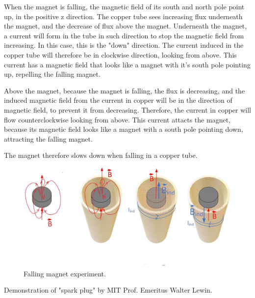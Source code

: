 \documentclass{ximera}
\begin{document}
When the magnet is falling, the magnetic field of its south and north pole point up, in the positive z direction. The copper tube sees increasing flux underneath the magnet, and the decrease of flux above the magnet. Underneath the magnet, a current will form in the tube in such direction to stop the magnetic field from increasing. In this case, this is the "down" direction. The current induced in the copper tube will therefore be in clockwise direction, looking from above. This current has a magnetic field that looks like a magnet with it's south pole pointing up, repelling the falling magnet. 


Above the magnet, because the magnet is falling, the flux is decreasing, and the induced magnetic field from the current in copper will be in the direction of magnetic field, to prevent it from decreasing. Therefore, the current in copper will flow counterclockwise looking from above. This current attacts the magnet, because its magnetic field looks like a magnet with a south pole pointing down, attracting the falling magnet. 

The magnet therefore slows down when falling in a copper tube.

\begin{figure}[htbp]
\begin{center}
\includegraphics[scale=0.5]{../jpg/fallingMagnet.jpg}
\end{center}
\caption{Falling magnet experiment.}
\label{fig:FallingMagnet}
\end{figure}



\begin{example}


Demonstration of "spark plug" by MIT Prof. Emeritus Walter Lewin.
\begin{center}  
\end{center} 


\end{example}
\end{document}
